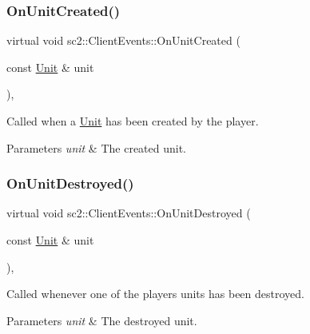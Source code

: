 \subsubsection{\texorpdfstring{On\+Unit\+Created()}{OnUnitCreated()}}
{\footnotesize\ttfamily virtual void sc2\+::\+Client\+Events\+::\+On\+Unit\+Created (\begin{DoxyParamCaption}\item[{const \hyperlink{classsc2_1_1_unit}{Unit} \&}]{unit }\end{DoxyParamCaption})\hspace{0.3cm}{\ttfamily [inline]}, {\ttfamily [virtual]}}

Called when a \hyperlink{classsc2_1_1_unit}{Unit} has been created by the player. 
\begin{DoxyParams}{Parameters}
{\em unit} & The created unit. \\
\hline
\end{DoxyParams}
\mbox{\label{classsc2_1_1_client_events_ae80cd238b975c76b5db062939949b598}} 
\subsubsection{\texorpdfstring{On\+Unit\+Destroyed()}{OnUnitDestroyed()}}
{\footnotesize\ttfamily virtual void sc2\+::\+Client\+Events\+::\+On\+Unit\+Destroyed (\begin{DoxyParamCaption}\item[{const \hyperlink{classsc2_1_1_unit}{Unit} \&}]{unit }\end{DoxyParamCaption})\hspace{0.3cm}{\ttfamily [inline]}, {\ttfamily [virtual]}}

Called whenever one of the player\textquotesingle{}s units has been destroyed. 
\begin{DoxyParams}{Parameters}
{\em unit} & The destroyed unit. \\
\hline
\end{DoxyParams}
\mbox{\label{classsc2_1_1_client_events_aecbbd77ffd17a729b307f87bbb899cc9}} 
